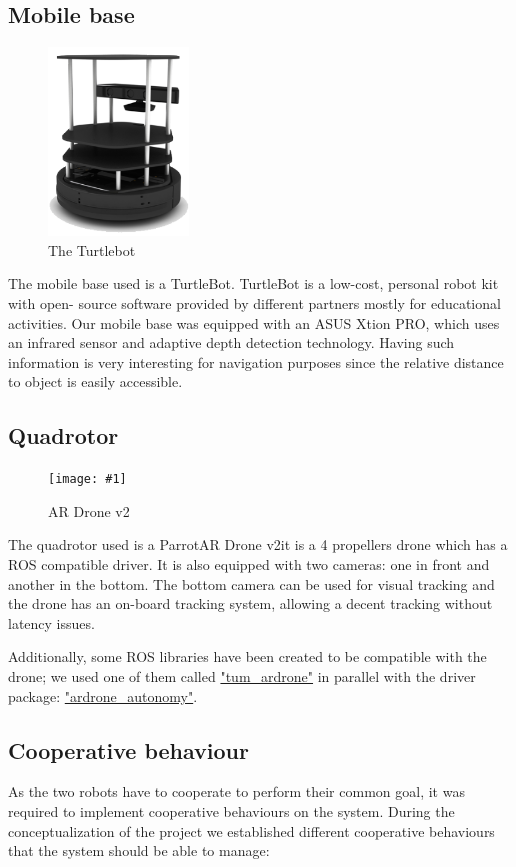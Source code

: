 \documentclass[11pt,a4paper]{article}
\newcommand{\centerFigure}[2]{
\begin{figure}[h]	
\centering
\texttt{[image: \#1]}
\caption{#2}
\end{figure}
}
\begin{document}
\subsection{Mobile base}

\begin{figure}[h]	
\centering
\includegraphics[height=5cm]{turtlebot.png}
\caption{The Turtlebot}
\end{figure}

The mobile base used is a TurtleBot. TurtleBot is a low-cost, personal robot kit with open-
source software
provided by different partners mostly for educational activities.
Our mobile base was equipped with an ASUS Xtion PRO, which uses an infrared sensor and adaptive depth detection technology. Having such information is very interesting for 
navigation
purposes since the relative distance to object is easily accessible.

\subsection{Quadrotor}
\centerFigure{arDroneGpsEdition.png}{AR Drone v2}

The quadrotor used is a Parrot\textcopyright AR Drone v2\texttrademark it is a 4 propellers
drone which has a ROS compatible driver. It is also equipped with two cameras: one in front
and another in the bottom. The bottom camera can be used for visual tracking and the drone
has an on-board tracking system, allowing a decent tracking without latency issues.

Additionally, some ROS libraries have been created to be compatible with the drone; we used
one of them called \href{"http://wiki.ros.org/tum_ardrone"}{"tum\_ardrone"} in parallel with
the driver package: \href{"https://github.com/AutonomyLab/ardrone_autonomy"}
{"ardrone\_autonomy"}.

\subsection{Cooperative behaviour}
As the two robots have to cooperate to perform their common goal, it was required to implement
cooperative behaviours on the system. During the conceptualization of the project we established different
cooperative behaviours that the system should be able to manage:
\end{document}
